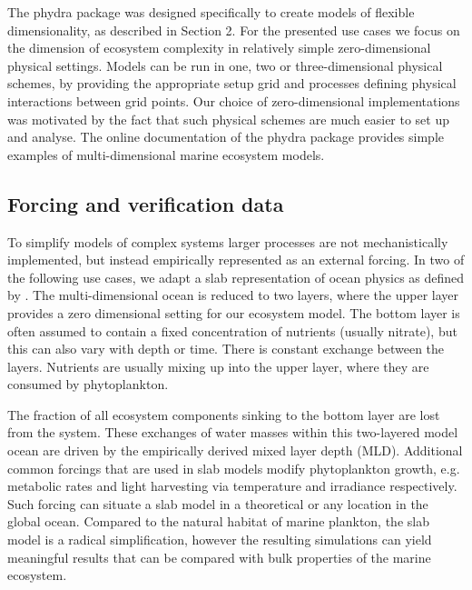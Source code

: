 \documentclass[template.tex]{subfiles}
\begin{document}
The phydra package was designed specifically to create models of flexible dimensionality, as described in Section 2. For the presented use cases we focus on the dimension of ecosystem complexity in relatively simple zero-dimensional physical settings. Models can be run in one, two or three-dimensional physical schemes, by providing the appropriate setup grid and processes defining physical interactions between grid points. Our choice of zero-dimensional implementations was motivated by the fact that such physical schemes are much easier to set up and analyse. The online documentation of the phydra package provides simple examples of multi-dimensional marine ecosystem models.\\




\subsection{Forcing and verification data} \label{ForcingSection}

To simplify models of complex systems larger processes are not mechanistically implemented, but instead empirically represented as an external forcing. In two of the following use cases, we adapt a slab representation of ocean physics as defined by \citet{Evans1985ACycles}. The multi-dimensional ocean is reduced to two layers, where the upper layer provides a zero dimensional setting for our ecosystem model. The bottom layer is often assumed to contain a fixed concentration of nutrients (usually nitrate), but this can also vary with depth or time. There is constant exchange between the layers. Nutrients are usually mixing up into the upper layer, where they are consumed by phytoplankton. 

The fraction of all ecosystem components sinking to the bottom layer are lost from the system. These exchanges of water masses within this two-layered model ocean are driven by the empirically derived mixed layer depth (MLD). Additional common forcings that are used in slab models modify phytoplankton growth, e.g. metabolic rates and light harvesting via temperature and irradiance respectively. Such forcing can situate a slab model in a theoretical or any location in the global ocean. Compared to the natural habitat of marine plankton, the slab model is a radical simplification, however the resulting simulations can yield meaningful results that can be compared with bulk properties of the marine ecosystem. 
\end{document}

